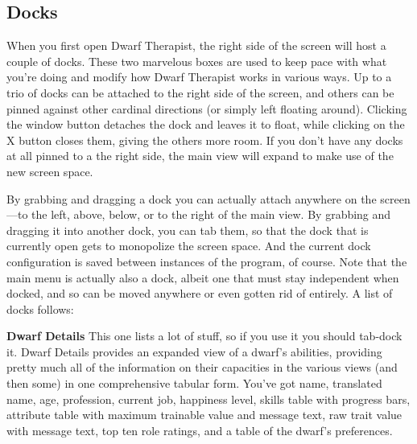\documentclass[]{article}
\newcommand{\boldlist}[1] {
\vspace{12pt}
\noindent \textbf{#1}
}
\begin{document}
\vfill
\newpage
\subsection{Docks}
\label{sec:Docks}

When you first open Dwarf Therapist, the right side of the screen will host a couple of docks. These two
marvelous boxes are used to keep pace with what you're doing and modify how Dwarf Therapist works in
various ways. Up to a trio of docks can be attached to the right side of the screen, and others can be
pinned against other cardinal directions (or simply left floating around). Clicking the window button
detaches the dock and leaves it to float, while clicking on the X button closes them, giving the others
more room. If you don't have any docks at all pinned to a the right side, the main view will expand to
make use of the new screen space.

By grabbing and dragging a dock you can actually attach anywhere on the screen---to the left, above,
below, or to the right of the main view. By grabbing and dragging it into another dock, you can tab them,
so that the dock that is currently open gets to monopolize the screen space. And the current dock
configuration is saved between instances of the program, of course. Note that the main menu is actually
also a dock, albeit one that must stay independent when docked, and so can be moved anywhere or even
gotten rid of entirely. A list of docks follows:

\boldlist{Dwarf Details} This one lists a lot of stuff, so if you use it you should tab-dock
it. Dwarf Details provides an expanded view of a dwarf's abilities, providing pretty much all of the
information on their capacities in the various views (and then some) in one comprehensive tabular form.
You've got name, translated name, age, profession, current job,  happiness level, skills table with
progress bars, attribute table with maximum trainable value and message text, raw trait value with
message text, top ten role ratings, and a table of the dwarf's preferences.
\end{document}

